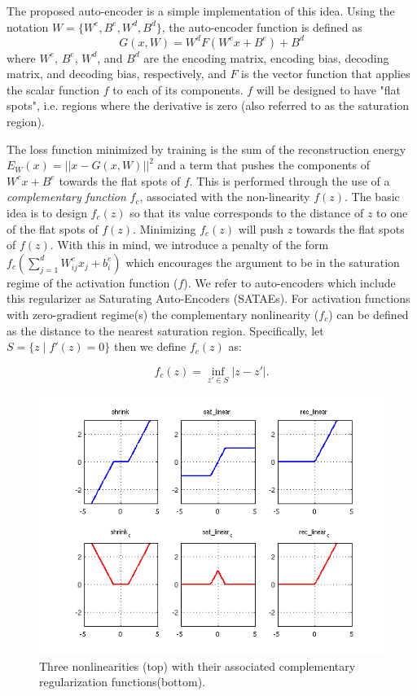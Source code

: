 The proposed auto-encoder is a simple implementation of this idea.  Using the
notation $W =\{W^e,B^e,W^d,B^d\}$, the auto-encoder function is defined as \[
G(x,W) = W^d F(W^e x+B^e) + B^d \] where $W^e$, $B^e$, $W^d$, and $B^d$ are the
encoding matrix, encoding bias, decoding matrix, and decoding bias,
respectively, and $F$ is the vector function that applies the scalar function
$f$ to each of its components. $f$ will be designed to have "flat spots", i.e.
regions where the derivative is zero (also referred to as the saturation
region).

The loss function minimized by training is the sum of the reconstruction energy
$E_W(x)=||x-G(x,W)||^2$ and a term that pushes the components of $W^e x + B^e$
towards the flat spots of $f$. This is performed through the use of a {\em
complementary function} $f_c$, associated with the non-linearity $f(z)$. The
basic idea is to design $f_c(z)$ so that its value corresponds to the distance
of $z$ to one of the flat spots of $f(z)$. Minimizing $f_c(z)$ will push $z$
towards the flat spots of $f(z)$. With this in mind, we introduce a penalty of
the form $f_c(\sum_{j=1}^d W^e_{ij}x_j + b^e_i)$ which encourages the argument
to be in the saturation regime of the activation function ($f$). We refer to
auto-encoders which include this regularizer as Saturating Auto-Encoders
(SATAEs). For activation functions with zero-gradient regime(s) the
complementary nonlinearity ($f_c$) can be defined as the distance to the
nearest saturation region. Specifically, let $S = \{z \mid  f'(z) = 0\}$ then
we define $f_c(z)$ as: 

\begin{equation} f_c(z) = \inf_ {z' \in S} |z-z'|.   \end{equation}   

\begin{figure} \centering \includegraphics[scale=0.6]{./figures/SATAE/compliments.png}
\caption{Three nonlinearities (top) with their associated complementary
regularization functions(bottom).}  \label{fig:nonlin} \end{figure} 

